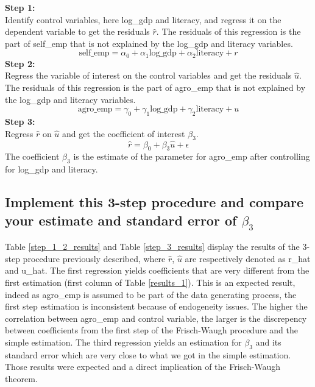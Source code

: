 \textbf{Step 1:}\\
Identify control variables, here log\_gdp and literacy, and regress it on the dependent variable to get the residuals $\hat{r}$. The residuals of this regression is the part of self\_emp that is not explained by the log\_gdp and literacy variables.
\begin{equation*}
  \text{self\_emp} = \alpha_0 + \alpha_1 \text{log\_gdp} + \alpha_2 \text{literacy} + r 
\end{equation*}
\textbf{Step 2:}\\
Regress the variable of interest on the control variables and get the residuals $\hat{u}$. The residuals of this regression is the part of agro\_emp that is not explained by the log\_gdp and literacy variables.
\begin{equation*}
  \text{agro\_emp} = \gamma_0 + \gamma_1 \text{log\_gdp} + \gamma_2 \text{literacy} + u 
\end{equation*}
\textbf{Step 3:}\\
Regress $\hat{r}$ on $\hat{u}$ and get the coefficient of interest $\beta_3$. 
\begin{equation*}
  \hat{r} = \beta_0 + \beta_3 \hat{u} + \epsilon
\end{equation*}
The coefficient $\beta_3$ is the estimate of the parameter for agro\_emp after controlling for log\_gdp and literacy.

\subsection{Implement this 3-step procedure and compare your estimate and standard error of $\beta_3$}
Table \ref{step_1_2_results} and Table \ref{step_3_results} display the results of the 3-step
procedure previously described,
where $\hat{r}$, $\hat{u}$ are respectively denoted as r\_hat and u\_hat.
The first regression yields coefficients that are very different from the first estimation (first column of Table \ref{results_1}).
This is an expected result, indeed as agro\_emp is assumed to be part of the data generating process,
the first step estimation is inconsistent because of endogeneity issues.
The higher the correlation between agro\_emp and control variable, the larger is the discrepency between coefficients from the first step of the Frisch-Waugh procedure and the simple estimation.
The third regression yields an estimation for $\beta_3$ and its standard error which are very close to what we got in the simple estimation.
Those results were expected and a direct implication of the Frisch-Waugh theorem. 



